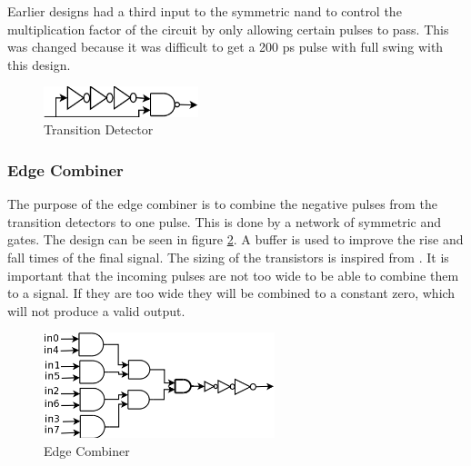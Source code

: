\documentclass[a4paper,12pt]{article} \usepackage{graphicx}
\begin{document}
Earlier designs had a third input to the symmetric nand to control the
multiplication factor of the circuit by only allowing certain pulses to pass.
This was changed because it was difficult to get a 200 ps pulse with full swing
with this design.

\begin{figure}[p]
        \centering
        \includegraphics[width=0.4\textwidth]{../Bilder/trans_detect_trans.png}
        \caption{Transition Detector}
        \label{fig:trans_detect}
\end{figure}

\subsubsection{Edge Combiner}
The purpose of the edge combiner is to combine the negative pulses from the
transition detectors to one pulse. This is done by a network of symmetric and
gates. The design can be seen in figure \ref{fig:edge_comb}. A buffer is used to
improve the rise and fall times of the final signal.
The sizing of the transistors is inspired from \cite{dll_report}.
It is important that the incoming pulses are not too wide to be able to combine
them to a signal. If they are too wide they will be combined to a constant zero,
which will not produce a valid output.

\begin{figure}[p]
        \centering
        \includegraphics[width=0.6\textwidth]{../Bilder/edge_combiner_trans.png}
        \caption{Edge Combiner}
        \label{fig:edge_comb}
\end{figure}
\end{document}
